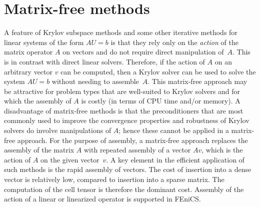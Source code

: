 \section{Matrix-free methods}

A feature of Krylov subspace methods and some other iterative methods
for linear systems of the form $AU = b$ is that they rely only on the
\emph{action} of the matrix operator $A$ on vectors and do not require
direct manipulation of~$A$. This is in contrast with direct linear
solvers. Therefore, if the action of $A$ on an arbitrary vector $v$
can be computed, then a Krylov solver can be used to solve the system
$AU = b$ without needing to assemble~$A$. This matrix-free approach
may be attractive for problem types that are well-suited to Krylov
solvers and for which the assembly of $A$ is costly (in terms of CPU
time and/or memory).  A disadvantage of matrix-free methods is that
the preconditioners that are most commonly used to improve the
convergence properties and robustness of Krylov solvers do involve
manipulations of $A$; hence these cannot be applied in a matrix-free
approach. For the purpose of assembly, a matrix-free approach replaces
the assembly of the matrix $A$ with repeated assembly of a vector
$Av$, which is the action of $A$ on the given vector~$v$. A key
element in the efficient application of such methods is the rapid
assembly of vectors. The cost of insertion into a dense vector is
relatively low, compared to insertion into a sparse matrix. The
computation of the cell tensor is therefore the dominant
cost. Assembly of the action of a linear or linearized operator is
supported in FEniCS.
